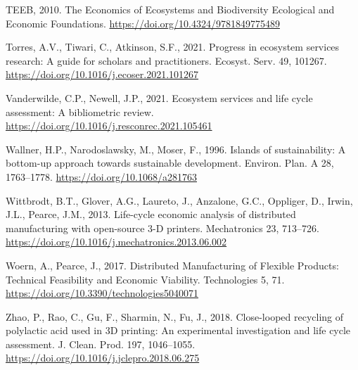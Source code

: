 \documentclass[]{elsarticle} %
\newlength{\cslhangindent}
\newenvironment{CSLReferences}[2] %
 {%
  \setlength{\parindent}{0pt}
  \ifodd #1 \everypar{\setlength{\hangindent}{\cslhangindent}}\ignorespaces\fi
  \ifnum #2 > 0
  \setlength{\parskip}{#2\baselineskip}
  \fi
 }%
 {}
\begin{document}
\begin{CSLReferences}{1}{0}
\leavevmode{}%
TEEB, 2010. {The Economics of Ecosystems and Biodiversity Ecological and Economic Foundations.} \url{https://doi.org/10.4324/9781849775489}

\leavevmode{}%
Torres, A.V., Tiwari, C., Atkinson, S.F., 2021. {Progress in ecosystem services research: A guide for scholars and practitioners}. Ecosyst. Serv. 49, 101267. \url{https://doi.org/10.1016/j.ecoser.2021.101267}

\leavevmode{}%
Vanderwilde, C.P., Newell, J.P., 2021. {Ecosystem services and life cycle assessment: A bibliometric review}. \url{https://doi.org/10.1016/j.resconrec.2021.105461}

\leavevmode{}%
Wallner, H.P., Narodoslawsky, M., Moser, F., 1996. {Islands of sustainability: A bottom-up approach towards sustainable development}. Environ. Plan. A 28, 1763--1778. \url{https://doi.org/10.1068/a281763}

\leavevmode{}%
Wittbrodt, B.T., Glover, A.G., Laureto, J., Anzalone, G.C., Oppliger, D., Irwin, J.L., Pearce, J.M., 2013. {Life-cycle economic analysis of distributed manufacturing with open-source 3-D printers}. Mechatronics 23, 713--726. \url{https://doi.org/10.1016/j.mechatronics.2013.06.002}

\leavevmode{}%
Woern, A., Pearce, J., 2017. {Distributed Manufacturing of Flexible Products: Technical Feasibility and Economic Viability}. Technologies 5, 71. \url{https://doi.org/10.3390/technologies5040071}

\leavevmode{}%
Zhao, P., Rao, C., Gu, F., Sharmin, N., Fu, J., 2018. {Close-looped recycling of polylactic acid used in 3D printing: An experimental investigation and life cycle assessment}. J. Clean. Prod. 197, 1046--1055. \url{https://doi.org/10.1016/j.jclepro.2018.06.275}

\end{CSLReferences}
\end{document}
